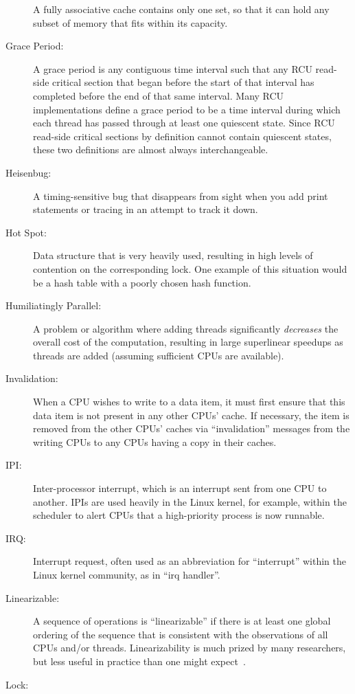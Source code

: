 \begin{description}
	A fully associative cache contains only
	one set, so that it can hold any subset of
	memory that fits within its capacity.
\item[Grace Period:]
	A grace period is any contiguous time interval such that
	any RCU read-side critical section that began before the
	start of that interval has
	completed before the end of that same interval.
	Many RCU implementations define a grace period to be a
	time interval during which each thread has passed through at
	least one quiescent state.
	Since RCU read-side critical sections by definition cannot
	contain quiescent states, these two definitions are almost
	always interchangeable.
\item[Heisenbug:]
	A timing-sensitive bug that disappears from sight when you
	add print statements or tracing in an attempt to track it
	down.
\item[Hot Spot:]
	Data structure that is very heavily used, resulting in high
	levels of contention on the corresponding lock.
	One example of this situation would be a hash table with
	a poorly chosen hash function.
\item[Humiliatingly Parallel:]
	A problem or algorithm where adding threads significantly
	\emph{decreases} the overall cost of the computation, resulting in
	large superlinear speedups as threads are added (assuming sufficient
	CPUs are available).
\item[Invalidation:]
	When a CPU wishes to write to a data item, it must first ensure
	that this data item is not present in any other CPUs' cache.
	If necessary, the item is removed from the other CPUs' caches
	via ``invalidation'' messages from the writing CPUs to any
	CPUs having a copy in their caches.
\item[IPI:]
	Inter-processor interrupt, which is an
	interrupt sent from one CPU to another.
	IPIs are used heavily in the Linux kernel, for example, within
	the scheduler to alert CPUs that a high-priority process is now
	runnable.
\item[IRQ:]
	Interrupt request, often used as an abbreviation for ``interrupt''
	within the Linux kernel community, as in ``irq handler''.
\item[Linearizable:]
	A sequence of operations is ``linearizable'' if there is at
	least one global ordering of the sequence that is consistent
	with the observations of all CPUs and/or threads.
	Linearizability is much prized by many researchers, but less
	useful in practice than one might
	expect~\cite{AndreasHaas2012FIFOisnt}.
\item[Lock:]

\end{description}
